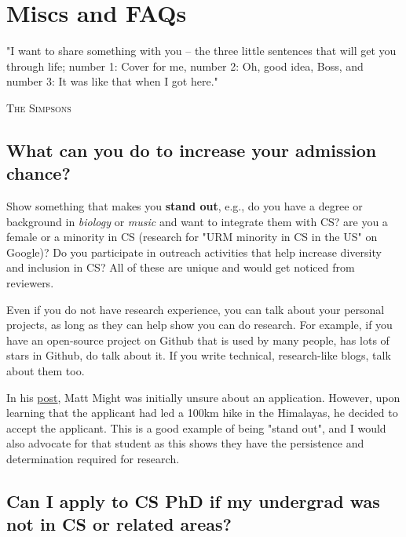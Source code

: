 \documentclass[11pt]{article}
\begin{document}
\section{Miscs and FAQs}
\epigraph{"I want to share something with you – the three little sentences that will get you through life; number 1: Cover for me, number 2: Oh, good idea, Boss, and number 3: It was like that when I got here."}{\textsc{The Simpsons}}

\subsection{What can you do to increase your admission chance?}\label{sec:improve-your-chance}

 Show something that makes you \textbf{stand out}, e.g., do you have a degree or background in \emph{biology} or \emph{music} and want to integrate them with CS? are you a female or a minority in CS (research for "URM minority in CS in the US" on Google)? Do you participate in outreach activities that help increase diversity and inclusion in CS? All of these are unique and would get noticed from reviewers. 
    
Even if you do not have research experience, you can talk about your personal projects, as long as they can help show you can do research. For example, if you have an open-source project on Github that is used by many people, has lots of stars in Github, do talk about it. If you write technical, research-like blogs, talk about them too.


In his \href{https://matt.might.net/articles/how-to-apply-and-get-in-to-graduate-school-in-science-mathematics-engineering-or-computer-science/}{post}, Matt Might was initially unsure about an application. However, upon learning that the applicant had led a 100km hike in the Himalayas, he decided to accept the applicant.  This is a good example of being "stand out", and I would also advocate for that student as this shows they have the persistence and determination required for research.







\subsection{Can I apply to CS PhD if my undergrad was not in CS or related areas?}
\end{document}
